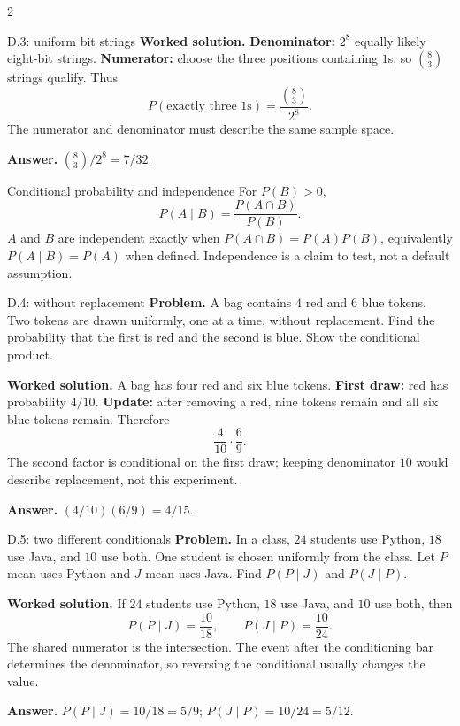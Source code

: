 \documentclass[10pt]{article}
\begin{document}
\begin{multicols}{2}
\begin{workedbox}{D.3: uniform bit strings}
\textbf{Worked solution.} \textbf{Denominator:} $2^8$ equally likely eight-bit strings.
\textbf{Numerator:} choose the three positions containing $1$s, so $\binom83$
strings qualify. Thus
\[
P(\text{exactly three }1\text{s})=\frac{\binom83}{2^8}.
\]
The numerator and denominator must describe the same sample space.

\textbf{Answer.} $\binom83/2^8=7/32$.
\end{workedbox}


\begin{definitionbox}{Conditional probability and independence}
For $P(B)>0$,
\[
P(A\mid B)=\frac{P(A\cap B)}{P(B)}.
\]
$A$ and $B$ are independent exactly when
$P(A\cap B)=P(A)P(B)$, equivalently $P(A\mid B)=P(A)$ when defined.
Independence is a claim to test, not a default assumption.
\end{definitionbox}

\begin{workedbox}{D.4: without replacement}
\textbf{Problem.} A bag contains $4$ red and $6$ blue tokens. Two tokens are drawn uniformly, one at a time, without replacement. Find the probability that the first is red and the second is blue. Show the conditional product.

\textbf{Worked solution.} A bag has four red and six blue tokens. \textbf{First draw:} red has
probability $4/10$. \textbf{Update:} after removing a red, nine tokens remain
and all six blue tokens remain. Therefore
\[
\frac4{10}\cdot\frac69.
\]
The second factor is conditional on the first draw; keeping denominator $10$
would describe replacement, not this experiment.

\textbf{Answer.} $(4/10)(6/9)=4/15$.
\end{workedbox}

\begin{workedbox}{D.5: two different conditionals}
\textbf{Problem.} In a class, $24$ students use Python, $18$ use Java, and $10$ use both. One student is chosen uniformly from the class. Let $P$ mean uses Python and $J$ mean uses Java. Find $P(P\mid J)$ and $P(J\mid P)$.

\textbf{Worked solution.} If $24$ students use Python, $18$ use Java, and $10$ use both, then
\[
P(P\mid J)=\frac{10}{18},\qquad
P(J\mid P)=\frac{10}{24}.
\]
The shared numerator is the intersection. The event after the conditioning bar
determines the denominator, so reversing the conditional usually changes the
value.

\textbf{Answer.} $P(P\mid J)=10/18=5/9$; $P(J\mid P)=10/24=5/12$.
\end{workedbox}


\end{multicols}
\end{document}
